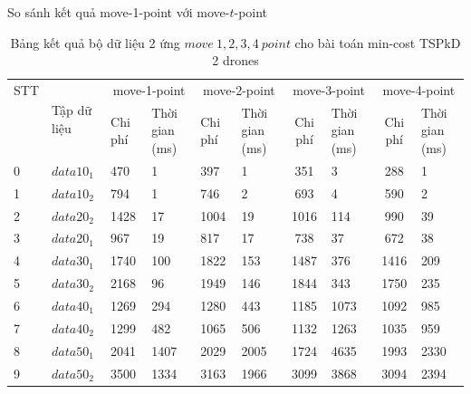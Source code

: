 \documentclass[compress]{beamer}
\begin{document}
\begin{frame}{So sánh kết quả move-1-point với move-$t$-point}
\tiny
\begin{longtable}{|p{0.2cm}|p{1.0cm}|p{0.55cm}|p{0.85cm}|p{0.6cm}|p{0.7cm}|c|p{0.85cm}|c|p{0.85cm}|}
\caption{Bảng kết quả bộ dữ liệu 2 ứng $move \ 1, 2, 3, 4 \ point$ cho bài toán min-cost TSPkD 2 drones}
\label{tabletspkd3}\\ 
\toprule
STT&\multirow{2}{*}{Tập dữ liệu} & \multicolumn{2}{c|}{move-1-point } &\multicolumn{2}{c|}{move-2-point } &\multicolumn{2}{c|}{move-3-point }&\multicolumn{2}{c|}{move-4-point } \\
\cline{3-10} 
&&Chi phí &Thời gian (ms)&Chi phí &Thời gian (ms)&Chi phí &Thời gian (ms)&Chi phí &Thời gian (ms)\\
\midrule
        \toprule
0&$data 10_1$&470& 1&
397& 1&
351 &3&
288& 1\\
\hline
1&$data 10_2$&794& 1&
746& 2&
693 &4&
590& 2 \\
\hline
2&$data 20_2$&1428 &17&
1004&  19&
1016& 114&
990& 39 \\
\hline
3&$data 20_1$&967& 19 &
817 &17&
738& 37&
672& 38\\
\hline
4&$data 30_1$&1740 &100&
1822& 153&
1487 &376&
1416& 209 \\
\hline

5&$data 30_2$&2168& 96&
1949& 146&
1844 &343&
1750 &235 \\
\hline
6&$data 40_1$&1269 & 294&
1280& 443&
1185& 1073&
1092& 985 \\
\hline
7&$data 40_2$&1299 & 482&
1065& 506&
1132 &1263&
1035 &959 \\
\hline
8&$data 50_1$&2041 &1407&
2029 &2005 &
1724 &4635 &
1993 & 2330\\
\hline
9&$data 50_2$ & 3500 & 1334 &
3163 & 1966 &
3099 & 3868 &
3094 & 2394\\
\hline

\end{longtable}
\normalsize
\end{frame}
\end{document}
